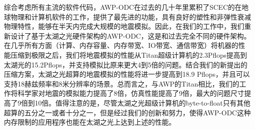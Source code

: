 \documentclass[degree=doctor]{thuthesis}
\begin{document}
综合考虑所有主流的软件代码，AWP-ODC在过去的几十年里累积了SCEC的在地球物理和计算机软件的工作，提供了最先进的功能，具有良好的塑性和非弹性衰减物理特性，能够在半天内完成大规模的地震模拟。因此，在我们的工作中，我们重新设计了基于太湖之光硬件架构的AWP-ODC，这是和过去完全不同的硬件架构。在几乎所有方面（计算、内存容量、内存带宽、IO带宽、通信带宽）将机器的性能压缩到极限之后，我们将地震模拟的性能从Titan超级计算机的2.3Pflops提高到太湖光的15.2Pflops，并支持模拟比原来更大4到5倍的问题。结合我们的新提出的压缩方案，太湖之光超算的地震模拟的性能将进一步提高到18.9 Pflops，并且可以支持18赫兹频率和8米分辨率的场景。总而言之，与AWP的Titan相比，我们的工作将科学家对地震的模拟能力提高了8倍，仿真性能提高了9倍，最大的问题尺寸提高了9倍到10倍。值得注意的是，尽管太湖之光超级计算机的byte-to-float只有其他超算的五分之一或者十分之一，但是经过我们的创新和努力，使得AWP-ODC这种内存限制的应用程序也能在太湖之光上达到上述的性能。
\end{document}
